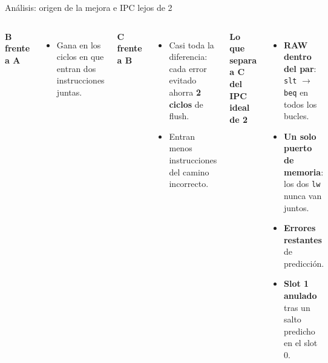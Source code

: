 \documentclass[aspectratio=169,10pt]{beamer}
\begin{document}
\begin{frame}{Análisis: origen de la mejora e IPC lejos de 2}
  \begin{columns}[T]
    \textbf{B frente a A}
    \begin{itemize}
      \item Gana en los ciclos en que entran dos instrucciones juntas.
    \end{itemize}
    \medskip
    \textbf{C frente a B}
    \begin{itemize}
      \item Casi toda la diferencia: cada error evitado ahorra \textbf{2 ciclos} de flush.
      \item Entran menos instrucciones del camino incorrecto.
    \end{itemize}
    \textbf{Lo que separa a C del IPC ideal de 2}
    \begin{itemize}
      \item \textbf{RAW dentro del par}: \texttt{slt} $\to$ \texttt{beq} en todos los bucles.
      \item \textbf{Un solo puerto de memoria}: los dos \texttt{lw} nunca van juntos.
      \item \textbf{Errores restantes} de predicción.
      \item \textbf{Slot 1 anulado} tras un salto predicho en el slot 0.
    \end{itemize}
  \end{columns}
\end{frame}
\end{document}
